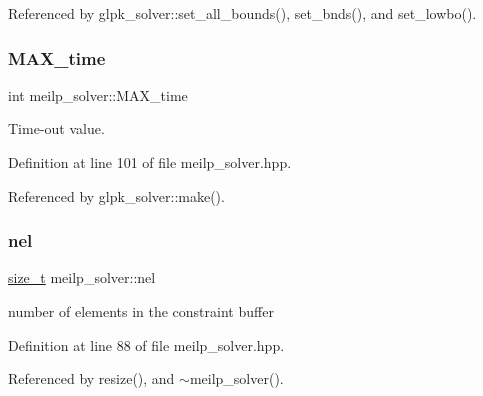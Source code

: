 Referenced by glpk\+\_\+solver\+::set\+\_\+all\+\_\+bounds(), set\+\_\+bnds(), and set\+\_\+lowbo().

\mbox{\label{classmeilp__solver_aa0beb16cba6ab7284e2d072e3627ae0e}} 
\subsubsection{\texorpdfstring{M\+A\+X\+\_\+time}{MAX\_time}}
{\footnotesize\ttfamily int meilp\+\_\+solver\+::\+M\+A\+X\+\_\+time\hspace{0.3cm}{\ttfamily [protected]}}



Time-\/out value. 



Definition at line 101 of file meilp\+\_\+solver.\+hpp.



Referenced by glpk\+\_\+solver\+::make().

\mbox{\label{classmeilp__solver_a07eb267f2f15c0f56cb1941334c8421d}} 
\subsubsection{\texorpdfstring{nel}{nel}}
{\footnotesize\ttfamily \hyperlink{tutorial__fpt__2017_2intro_2sixth_2test_8c_a7c94ea6f8948649f8d181ae55911eeaf}{size\+\_\+t} meilp\+\_\+solver\+::nel\hspace{0.3cm}{\ttfamily [private]}}



number of elements in the constraint buffer 



Definition at line 88 of file meilp\+\_\+solver.\+hpp.



Referenced by resize(), and $\sim$meilp\+\_\+solver().

\mbox{\label{classmeilp__solver_a61dba558fd122faf65d84c0946b71fcd}} 
